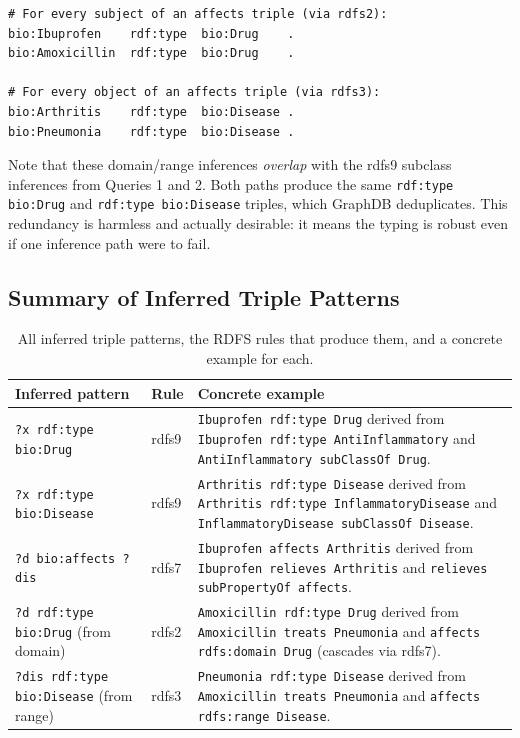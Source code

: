 \documentclass[11pt,a4paper]{article}
\begin{document}
\begin{lstlisting}[style=turtle]
# For every subject of an affects triple (via rdfs2):
bio:Ibuprofen    rdf:type  bio:Drug    .
bio:Amoxicillin  rdf:type  bio:Drug    .

# For every object of an affects triple (via rdfs3):
bio:Arthritis    rdf:type  bio:Disease .
bio:Pneumonia    rdf:type  bio:Disease .
\end{lstlisting}

Note that these domain/range inferences \emph{overlap} with the rdfs9 subclass
inferences from Queries 1 and 2.  Both paths produce the same
\texttt{rdf:type bio:Drug} and \texttt{rdf:type bio:Disease} triples, which
GraphDB deduplicates.  This redundancy is harmless and actually desirable: it
means the typing is robust even if one inference path were to fail.

\newpage

\subsection{Summary of Inferred Triple Patterns}

\begin{table}[h!]
\centering
\caption{All inferred triple patterns, the RDFS rules that produce them, and a
         concrete example for each.}
\renewcommand{\arraystretch}{1.35}
\begin{tabular}{@{}p{4.6cm}p{1.8cm}p{7cm}@{}}
\toprule
\textbf{Inferred pattern} & \textbf{Rule} & \textbf{Concrete example} \\
\midrule
\texttt{?x rdf:type bio:Drug} &
rdfs9 &
\texttt{Ibuprofen rdf:type Drug} derived from
\texttt{Ibuprofen rdf:type AntiInflammatory} and
\texttt{AntiInflammatory subClassOf Drug}. \\

\texttt{?x rdf:type bio:Disease} &
rdfs9 &
\texttt{Arthritis rdf:type Disease} derived from
\texttt{Arthritis rdf:type InflammatoryDisease} and
\texttt{InflammatoryDisease subClassOf Disease}. \\

\texttt{?d bio:affects ?dis} &
rdfs7 &
\texttt{Ibuprofen affects Arthritis} derived from
\texttt{Ibuprofen relieves Arthritis} and
\texttt{relieves subPropertyOf affects}. \\

\texttt{?d rdf:type bio:Drug} (from domain) &
rdfs2 &
\texttt{Amoxicillin rdf:type Drug} derived from
\texttt{Amoxicillin treats Pneumonia} and
\texttt{affects rdfs:domain Drug} (cascades via rdfs7). \\

\texttt{?dis rdf:type bio:Disease} (from range) &
rdfs3 &
\texttt{Pneumonia rdf:type Disease} derived from
\texttt{Amoxicillin treats Pneumonia} and
\texttt{affects rdfs:range Disease}. \\
\bottomrule
\end{tabular}
\end{table}
\end{document}
